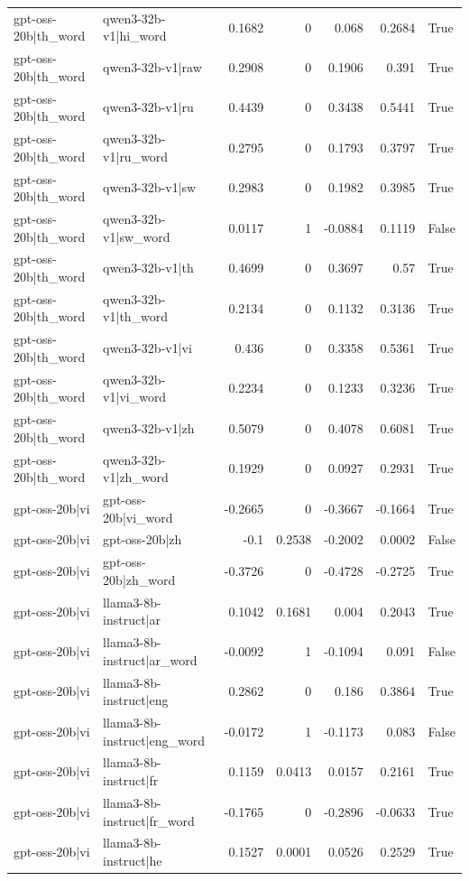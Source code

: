\begin{table}
\begin{tabular}{l l r r r r l}
gpt-oss-20b|th_word & qwen3-32b-v1|hi_word & 0.1682 & 0 & 0.068 & 0.2684 & True \\
gpt-oss-20b|th_word & qwen3-32b-v1|raw & 0.2908 & 0 & 0.1906 & 0.391 & True \\
gpt-oss-20b|th_word & qwen3-32b-v1|ru & 0.4439 & 0 & 0.3438 & 0.5441 & True \\
gpt-oss-20b|th_word & qwen3-32b-v1|ru_word & 0.2795 & 0 & 0.1793 & 0.3797 & True \\
gpt-oss-20b|th_word & qwen3-32b-v1|sw & 0.2983 & 0 & 0.1982 & 0.3985 & True \\
gpt-oss-20b|th_word & qwen3-32b-v1|sw_word & 0.0117 & 1 & -0.0884 & 0.1119 & False \\
gpt-oss-20b|th_word & qwen3-32b-v1|th & 0.4699 & 0 & 0.3697 & 0.57 & True \\
gpt-oss-20b|th_word & qwen3-32b-v1|th_word & 0.2134 & 0 & 0.1132 & 0.3136 & True \\
gpt-oss-20b|th_word & qwen3-32b-v1|vi & 0.436 & 0 & 0.3358 & 0.5361 & True \\
gpt-oss-20b|th_word & qwen3-32b-v1|vi_word & 0.2234 & 0 & 0.1233 & 0.3236 & True \\
gpt-oss-20b|th_word & qwen3-32b-v1|zh & 0.5079 & 0 & 0.4078 & 0.6081 & True \\
gpt-oss-20b|th_word & qwen3-32b-v1|zh_word & 0.1929 & 0 & 0.0927 & 0.2931 & True \\
gpt-oss-20b|vi & gpt-oss-20b|vi_word & -0.2665 & 0 & -0.3667 & -0.1664 & True \\
gpt-oss-20b|vi & gpt-oss-20b|zh & -0.1 & 0.2538 & -0.2002 & 0.0002 & False \\
gpt-oss-20b|vi & gpt-oss-20b|zh_word & -0.3726 & 0 & -0.4728 & -0.2725 & True \\
gpt-oss-20b|vi & llama3-8b-instruct|ar & 0.1042 & 0.1681 & 0.004 & 0.2043 & True \\
gpt-oss-20b|vi & llama3-8b-instruct|ar_word & -0.0092 & 1 & -0.1094 & 0.091 & False \\
gpt-oss-20b|vi & llama3-8b-instruct|eng & 0.2862 & 0 & 0.186 & 0.3864 & True \\
gpt-oss-20b|vi & llama3-8b-instruct|eng_word & -0.0172 & 1 & -0.1173 & 0.083 & False \\
gpt-oss-20b|vi & llama3-8b-instruct|fr & 0.1159 & 0.0413 & 0.0157 & 0.2161 & True \\
gpt-oss-20b|vi & llama3-8b-instruct|fr_word & -0.1765 & 0 & -0.2896 & -0.0633 & True \\
gpt-oss-20b|vi & llama3-8b-instruct|he & 0.1527 & 0.0001 & 0.0526 & 0.2529 & True \\

\end{tabular}
\end{table}
